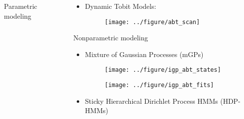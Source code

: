\documentclass[final, 8pt]{beamer}
\newlength{\onecolwid}
\begin{document}
\begin{frame}
\begin{columns}
\begin{column}{\onecolwid}
\begin{block}{Parametric modeling}
\end{block}

\end{column}
\begin{column}{\onecolwid}

\begin{itemize}
\item Dynamic Tobit Models:
\begin{figure}[!p]
  \centering
  \texttt{[image: ../figure/abt\_scan]}
  \caption{\label{fig:abt_scan}}
\end{figure}
\end{itemize}

\begin{block}{Nonparametric modeling}
\begin{itemize}
\item Mixture of Gaussian Processes (mGPs)
\begin{figure}[!p]
  \centering
  \texttt{[image: ../figure/igp\_abt\_states]}
  \caption{\label{fig:igp_abt_states}}
\end{figure}

\begin{figure}[!p]
  \centering
  \texttt{[image: ../figure/igp\_abt\_fits]}
  \caption{\label{fig:igp_abt_fits}}
\end{figure}

\item Sticky Hierarchical Dirichlet Process HMMs (HDP-HMMs)
\end{itemize}
\end{block}

 
 
\end{column}
\end{columns}

\end{frame}
\end{document}
